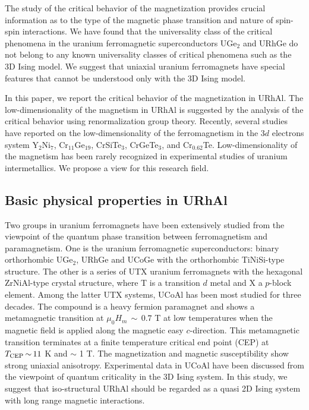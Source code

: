 \documentclass[twocolumn,showpacs,preprintnumbers,amsmath,amssymb]{revtex4}
\begin{document}
 The study of the critical behavior of the magnetization provides crucial information as to the type of the magnetic phase transition and nature of spin-spin interactions. We have found that the universality class of the critical phenomena in the uranium ferromagnetic superconductors UGe$_2$ and URhGe do not belong to any known universality classes of critical phenomena such as the 3D Ising model\cite{tateiwa1}. We suggest that uniaxial uranium ferromagnets have special features that cannot be understood only with the 3D Ising model. 
 
 In this paper, we report the critical behavior of the magnetization in URhAl. The low-dimensionality of the magnetism in URhAl is suggested by the analysis of the critical behavior using renormalization group theory. Recently, several studies have reported on the low-dimensionality of the ferromagnetism in the $3d$ electrons system Y$_2$Ni$_7$, Cr$_{11}$Ge$_{19}$, CrSiTe$_3$, CrGeTe$_3$, and Cr$_{0.62}$Te\cite{bhattacharyya,han,liu,liu2,lin,liu3}. Low-dimensionality of the magnetism has been rarely recognized in experimental studies of uranium intermetallics. We propose a view for this research field. 

  \subsection{Basic physical properties in URhAl}
 Two groups in uranium ferromagnets have been extensively studied from the viewpoint of the quantum phase transition between ferromagnetism and paramagnetism. One is the uranium ferromagnetic superconductors: binary orthorhombic UGe$_2$, URhGe and UCoGe with the orthorhombic TiNiSi-type structure. The other is a series of UTX uranium ferromagnets with the hexagonal ZrNiAl-type crystal structure, where T is a transition $d$ metal and X a $p$-block element\cite{sechovsky}. Among the latter UTX systems, UCoAl has been most studied for three decades\cite{aoki,sechovsky,matsuda1,javorsky1,kucera,matsuda2,nohara,karube1,matsuda3,morales,combier1,takeda,karube2,shimizu1,kimura,combier2}. The compound is a heavy fermion paramagnet and shows a metamagnetic transition at ${{\mu}_0}{H_m}{\,}{\sim}{\,}0.7 $ T at low temperatures when the magnetic field is applied along the magnetic easy $c$-direction. This metamagnetic transition terminates at a finite temperature critical end point (CEP) at $T_{\rm CEP}{\,}{\sim}{\,} 11$ K and ${\sim}$ 1 T. The magnetization and magnetic susceptibility show strong uniaxial anisotropy. Experimental data in UCoAl have been discussed from the viewpoint of quantum criticality in the 3D Ising system. In this study, we suggest that iso-structural URhAl should be regarded as a quasi 2D Ising system with long range magnetic interactions.
\end{document}

